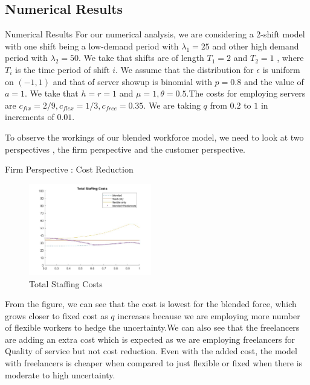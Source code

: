 \documentclass[8pt]{beamer}
\begin{document}
\subsection{Numerical Results}
\begin{frame}{Numerical Results}
For our numerical analysis, we are considering a 2-shift model with one shift being a low-demand period with $\lambda_1=25$ and other high demand period with $\lambda_2=50$. We take that shifts are of length $T_1=2$ and $T_2=1$ , where $T_i$ is the time period of shift $i$. We assume that the distribution for $\epsilon$ is uniform on $(-1,1)$ and that of server showup is binomial with $p=0.8$ and the value of $a=1$. We take that $h=r=1$ and $\mu=1,\theta=0.5$.The costs for employing servers are $c_{fix}=2/9,c_{flex}=1/3,c_{free}=0.35$. We are taking $q$ from $0.2$ to $1$ in increments of $0.01$. \bigskip

To observe the workings of our blended workforce model, we need to look at two perspectives , the firm perspective and the customer perspective.
\end{frame}
\begin{frame}{Firm Perspective : Cost Reduction}
\begin{figure}[hbt!]
\includegraphics[height=4cm]{cost.jpg}
\caption{Total Staffing Costs}
\end{figure}
From the figure, we can see that the cost is lowest for the blended force, which grows closer to fixed cost as $q$ increases because we are employing more number of flexible workers to hedge the uncertainty.We can also see that the freelancers are adding an extra cost which is expected as we are employing freelancers for Quality of service but not cost reduction. Even with the added cost, the model with freelancers is cheaper when compared to just flexible or fixed when there is moderate to high uncertainty.
\end{frame}
\end{document}
